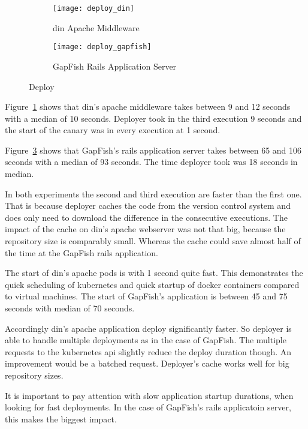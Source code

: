 \begin{figure}[htbp]
  \label{fig:deploy}
  \centering
  \begin{subfigure}{.5\textwidth}
    \texttt{[image: deploy\_din]}
    \caption[DIN]{\gls{din} Apache Middleware}
    \label{fig:deploy_din}
  \end{subfigure}%
  \begin{subfigure}{.5\textwidth}
    \texttt{[image: deploy\_gapfish]}
    \caption[GapFish]{GapFish Rails Application Server}
    \label{fig:deploy_gapfish}
  \end{subfigure}
  \caption[Deploy]{Deploy}
\end{figure}

Figure~\ref{fig:deploy_din} shows that \gls{din}'s apache middleware takes between 9 and 12
seconds with a median of 10 seconds. Deployer took in the third execution 9 seconds and
the start of the canary was in every execution at 1 second.

Figure~\ref{fig:deploy_gapfish} shows that GapFish's rails application server takes
between 65 and 106 seconds with a median of 93 seconds. The time deployer took was 18
seconds in median.

In both experiments the second and third execution are faster than the first one. That is
because deployer caches the code from the version control system and does only need to
download the difference in the consecutive executions. The impact of the cache on \gls{din}'s
apache webserver was not that big, because the repository size is comparably
small. Whereas the cache could save almost half of the time at the GapFish rails
application.

The start of \gls{din}'s apache pods is with 1 second quite fast. This demonstrates the quick
scheduling of kubernetes and quick startup of docker containers compared to virtual
machines. The start of GapFish's application is between 45 and 75 seconds with median of
70 seconds.

Accordingly \gls{din}'s apache application deploy significantly faster. So deployer is able to
handle multiple deployments as in the case of GapFish. The multiple requests to the
kubernetes api slightly reduce the deploy duration though. An improvement would be a
batched request. Deployer's cache works well for big repository sizes.

It is important to pay attention with slow application startup durations, when looking for
fast deployments. In the case of GapFish's rails applicatoin server, this makes the
biggest impact.

